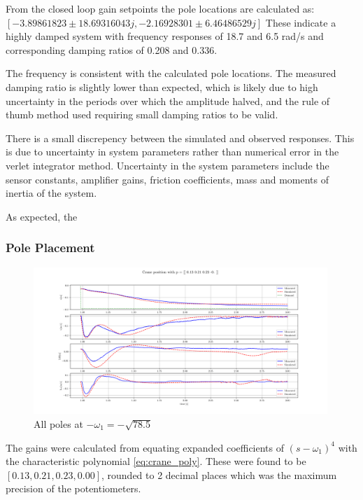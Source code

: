 \documentclass{article}
\begin{document}
From the closed loop gain setpoints the pole locations are calculated as: \\
$[-3.89861823 \pm 18.69316043j, -2.16928301 \pm 6.46486529j]$
These indicate a highly damped system with frequency responses of 18.7 and 6.5 rad/s and corresponding damping ratios of 0.208 and 0.336.

The frequency is consistent with the calculated pole locations. The measured damping ratio is slightly lower than expected, 
which is likely due to high uncertainty in the periods over which the amplitude halved, and the rule of thumb method used requiring small damping ratios to be valid.

There is a small discrepency between the simulated and observed responses. This is due to uncertainty in system parameters rather than numerical error in the verlet integrator method.
Uncertainty in the system parameters include the sensor constants, amplifier gains, friction coefficients, mass and moments of inertia of the system.

As expected, the 

\subsubsection{Pole Placement}

\begin{figure}[H]
  \centering
  \includegraphics[width=0.99\textwidth]{figures/3.4a.png}
  \caption{All poles at $-\omega_1 = -\sqrt{78.5}$}
  \label{fig:exp3.4a}
\end{figure}

The gains were calculated from equating expanded coefficients of $(s - \omega_1)^4$ with the characteristic polynomial \ref{eq:crane_poly}.
These were found to be $[ 0.13,  0.21,  0.23, 0.00 ]$, rounded to 2 decimal places which was the maximum precision of the potentiometers.
\end{document}
